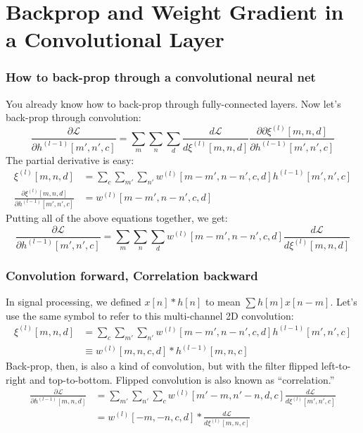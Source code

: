 \documentclass{beamer}
\begin{document}
\section[Backprop]{Backprop and Weight Gradient in a Convolutional Layer}
\setcounter{subsection}{1}

\begin{frame}
  \frametitle{How to back-prop through a convolutional neural net}

  You already know how to back-prop through fully-connected layers.  Now let's
  back-prop through convolution:
  \begin{displaymath}
    \frac{\partial{\mathcal L}}{\partial h^{(l-1)}[m',n',c]} =
    \sum_{m}\sum_n\sum_d\frac{d{\mathcal L}}{d\xi^{(l)}[m,n,d]}
    \frac{\partial \partial\xi^{(l)}[m,n,d]}{\partial h^{(l-1)}[m',n',c]}
  \end{displaymath}
  The partial derivative is easy:
  \begin{align*}
    \xi^{(l)}[m,n,d] &= \sum_c\sum_{m'}\sum_{n'} w^{(l)}[m-m',n-n',c,d]h^{(l-1)}[m',n',c]\\
    \frac{\partial\xi^{(l)}[m,n,d]}{\partial h^{(l-1)}[m',n',c]} &= w^{(l)}[m-m',n-n',c,d]
  \end{align*}
  Putting all of the above equations together, we get:
  \begin{displaymath}
    \frac{\partial{\mathcal L}}{\partial h^{(l-1)}[m',n',c]} =
    \sum_{m}\sum_n\sum_d w^{(l)}[m-m',n-n',c,d]\frac{d{\mathcal L}}{d\xi^{(l)}[m,n,d]}
  \end{displaymath}
\end{frame}

\begin{frame}
  \frametitle{Convolution forward, Correlation backward}

  In signal processing, we defined $x[n]\ast h[n]$ to mean $\sum
  h[m]x[n-m]$.  Let's use the same symbol to refer to this
  multi-channel 2D convolution:
  \begin{align*}
    \xi^{(l)}[m,n,d] &= \sum_c\sum_{m'}\sum_{n'} w^{(l)}[m-m',n-n',c,d]h^{(l-1)}[m',n',c]\\
    &\equiv w^{(l)}[m,n,c,d] \ast h^{(l-1)}[m,n,c]
  \end{align*}
  Back-prop, then, is also a kind of convolution, but with the filter
  flipped left-to-right and top-to-bottom.  Flipped convolution is also
  known as ``correlation.''
  \begin{align*}
    \frac{\partial{\mathcal L}}{\partial h^{(l-1)}[m,n,d]} &=
    \sum_{m'}\sum_{n'}\sum_c w^{(l)}[m'-m,n'-n,d,c]\frac{d{\mathcal L}}{d\xi^{(l)}[m',n',c]}\\
    &= w^{(l)}[-m,-n,c,d] \ast \frac{d{\mathcal L}}{d\xi^{(l)}[m,n,c]}\\
  \end{align*}
\end{frame}
\end{document}
